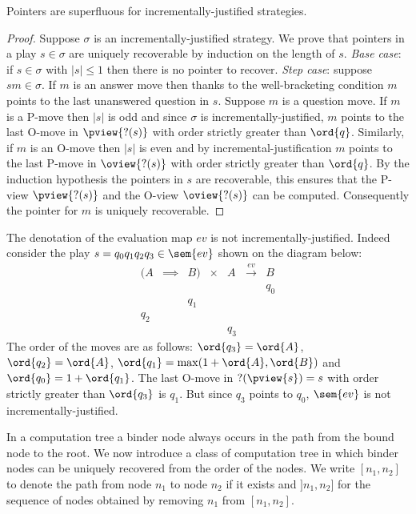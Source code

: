 \begin{lem}
\label{lem:incrjustified_pointers_uniqu_recover}
Pointers are superfluous for incrementally-justified strategies.
\end{lem}
\begin{proof}
Suppose $\sigma$ is an incrementally-justified strategy. We prove
that pointers in a play $s\in \sigma$ are uniquely recoverable by
induction on the length of $s$. \noindent \emph{Base case}: if $s
\in \sigma$ with $|s| \leq 1$ then there is no pointer to recover.
\noindent \emph{Step case}: suppose $s m \in \sigma$. If $m$ is an
answer move then thanks to the well-bracketing condition $m$ points
to the last unanswered question in $s$. Suppose $m$ is a question
move. If $m$ is a P-move then $|s|$ is odd and since $\sigma$ is
incrementally-justified, $m$ points to the last O-move in
$\pview{?(s)}$ with order strictly greater than $\ord{q}$.
Similarly, if $m$ is an O-move then $|s|$ is even and by
incremental-justification $m$ points to the last P-move in
$\oview{?(s)}$ with order strictly greater than $\ord{q}$. By the
induction hypothesis the pointers in $s$ are recoverable, this
ensures that the P-view $\pview{?(s)}$ and the O-view $\oview{?(s)}$
can be computed. Consequently the pointer for $m$ is uniquely
recoverable.
\end{proof}

\begin{exmp}
The denotation of the evaluation map $ev$ is not incrementally-justified. Indeed consider the play $s = q_0 q_1 q_2 q_3 \in \sem{ev}$
shown on the diagram below:
$$\begin{array}{cccccccc}
(A & \implies & B) & \times  & A & \stackrel{ev}{\longrightarrow} & B \\
&&&&&& q_0 \\
&& q_1 \\
 q_2 \\
 &&&&q_3
\end{array}$$
The order of the moves are as follows:  $\ord{q_3} = \ord{A}$, $\ord{q_2} = \ord{A}$,
$\ord{q_1} = \max( 1+\ord{A}, \ord{B})$ and $\ord{q_0} = 1 + \ord{q_1}$.
The last O-move in $?(\pview{s})= s$ with order strictly greater than $\ord{q_3}$ is $q_1$.
 But since $q_3$ points to $q_0$, $\sem{ev}$ is not incrementally-justified.
\end{exmp}


In a computation tree a binder node always occurs in the path from the bound node to the root.
We now introduce a class of computation tree in which binder nodes can be uniquely recovered from the order of the nodes.
We write $[n_1,n_2]$ to denote the path from node $n_1$ to node $n_2$ if it exists and $]n_1,n_2]$ for
the sequence of nodes obtained by removing $n_1$ from $[n_1,n_2]$.

